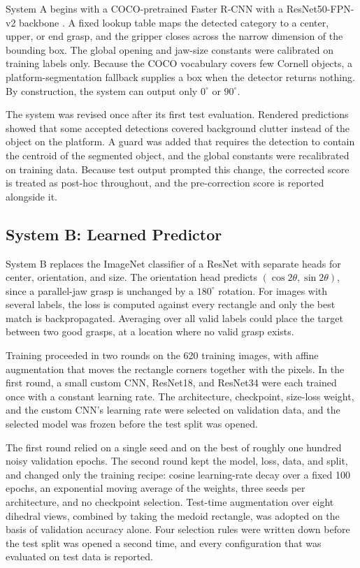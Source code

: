 \documentclass[10pt,conference,compsoc]{IEEEtran}
\begin{document}
System A begins with a COCO-pretrained Faster R-CNN with a ResNet50-FPN-v2
backbone \cite{ren2015}. A fixed lookup table maps the detected category to a
center, upper, or end grasp, and the gripper closes across the narrow
dimension of the bounding box. The global opening and jaw-size constants were
calibrated on training labels only. Because the COCO vocabulary covers few
Cornell objects, a platform-segmentation fallback supplies a box when the
detector returns nothing. By construction, the system can output only
$0^\circ$ or $90^\circ$.

The system was revised once after its first test evaluation. Rendered
predictions showed that some accepted detections covered background clutter
instead of the object on the platform. A guard was added that requires the
detection to contain the centroid of the segmented object, and the global
constants were recalibrated on training data. Because test output prompted
this change, the corrected score is treated as post-hoc throughout, and the
pre-correction score is reported alongside it.

\subsection{System B: Learned Predictor}

System B replaces the ImageNet classifier of a ResNet \cite{he2016} with
separate heads for center, orientation, and size. The orientation head
predicts $(\cos 2\theta,\sin 2\theta)$, since a parallel-jaw grasp is
unchanged by a $180^\circ$ rotation. For images with several labels, the loss
is computed against every rectangle and only the best match is
backpropagated. Averaging over all valid labels could place the target
between two good grasps, at a location where no valid grasp exists.

Training proceeded in two rounds on the 620 training images, with affine
augmentation that moves the rectangle corners together with the pixels. In
the first round, a small custom CNN, ResNet18, and ResNet34 were each trained
once with a constant learning rate. The architecture, checkpoint, size-loss
weight, and the custom CNN's learning rate were selected on validation data,
and the selected model was frozen before the test split was opened.

The first round relied on a single seed and on the best of roughly one
hundred noisy validation epochs. The second round kept the model, loss, data,
and split, and changed only the training recipe: cosine learning-rate decay
over a fixed 100 epochs, an exponential moving average of the weights, three
seeds per architecture, and no checkpoint selection. Test-time augmentation
over eight dihedral views, combined by taking the medoid rectangle, was
adopted on the basis of validation accuracy alone. Four selection rules were
written down before the test split was opened a second time, and every
configuration that was evaluated on test data is reported.
\end{document}
